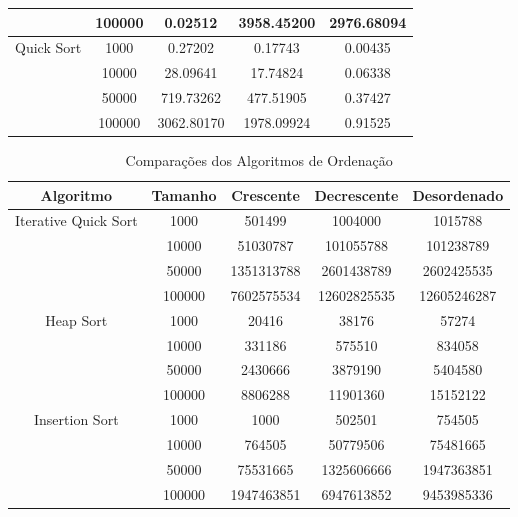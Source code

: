 \documentclass[12pt,a4paper]{article}
\begin{document}
\begin{table}[H]
\begin{tabular}{@{}ccccc@{}}
                         & 100000  & 0.02512   & 3958.45200  & 2976.68094  \\ \midrule
        Quick Sort        & 1000    & 0.27202   & 0.17743     & 0.00435     \\
                         & 10000   & 28.09641  & 17.74824    & 0.06338     \\
                         & 50000   & 719.73262 & 477.51905   & 0.37427     \\
                         & 100000  & 3062.80170 & 1978.09924  & 0.91525     \\ \bottomrule
    \end{tabular}
\end{table}

\begin{table}[H]
    \centering
    \caption{Comparações dos Algoritmos de Ordenação}
    \label{tab:comparacoes}
    \begin{tabular}{@{}ccccc@{}}
        \toprule
        Algoritmo         & Tamanho & Crescente & Decrescente & Desordenado \\ \midrule
        Iterative Quick Sort & 1000    & 501499    & 1004000     & 1015788     \\
                            & 10000   & 51030787  & 101055788   & 101238789   \\
                            & 50000   & 1351313788 & 2601438789  & 2602425535  \\
                            & 100000  & 7602575534 & 12602825535 & 12605246287 \\ \midrule
        Heap Sort            & 1000    & 20416     & 38176       & 57274       \\
                            & 10000   & 331186    & 575510      & 834058      \\
                            & 50000   & 2430666   & 3879190     & 5404580     \\
                            & 100000  & 8806288   & 11901360    & 15152122    \\ \midrule
        Insertion Sort       & 1000    & 1000      & 502501      & 754505      \\
                            & 10000   & 764505    & 50779506    & 75481665    \\
                            & 50000   & 75531665  & 1325606666  & 1947363851  \\
                            & 100000  & 1947463851 & 6947613852  & 9453985336  \\ \midrule

\end{tabular}
\end{table}
\end{document}
